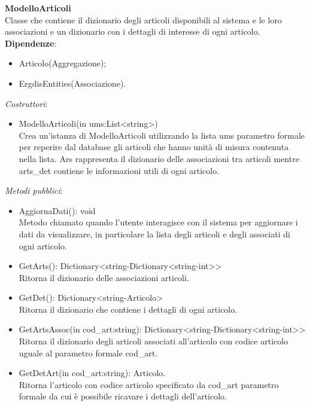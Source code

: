 \textbf{ModelloArticoli}\\
Classe che contiene il dizionario degli articoli disponibili al sistema e le loro associazioni e un dizionario con i dettagli di interesse di ogni articolo.
\textbf{Dipendenze}:
\begin{itemize}
    \item Articolo(Aggregazione);\\
    \item ErgdisEntities(Associazione).\\
\end{itemize}
\textit{Costruttori}:\\
\begin{itemize}
    \item ModelloArticoli(in ums:List<string>)\\
    Crea un'istanza di ModelloArticoli utilizzando la lista ums parametro formale per reperire dal database gli articoli che hanno unità di misura contenuta nella lista.
    Ars rappresenta il dizionario delle associazioni tra articoli mentre arts\_det contiene le informazioni utili di ogni articolo.
\end{itemize}
\textit{Metodi pubblici}:\\
\begin{itemize}
    \item AggiornaDati(): void \\
    Metodo chiamato quando l'utente interagisce con il sistema per aggiornare i dati da visualizzare, in particolare la lista degli articoli e degli associati di ogni articolo.
    \item GetArts(): Dictionary<string-Dictionary<string-int>> \\
    Ritorna il dizionario delle associazioni articoli.
    \item GetDet(): Dictionary<string-Articolo> \\
    Ritorna il dizionario che contiene i dettagli di ogni articolo.
    \item GetArtsAssoc(in cod\_art:string): Dictionary<string-Dictionary<string-int>> \\
    Ritorna il dizionario degli articoli associati all'articolo con codice articolo uguale al parametro formale cod\_art.
    \item GetDetArt(in cod\_art:string): Articolo. \\
    Ritorna l'articolo con codice articolo specificato da cod\_art parametro formale da cui è possibile ricavare i dettagli dell'articolo.
\end{itemize} 
